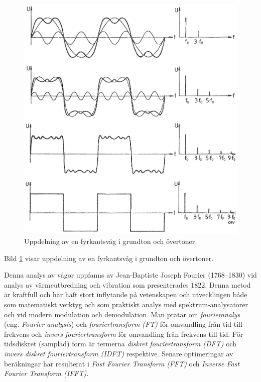 \begin{figure}
  \includegraphics[width=.9\textwidth]{images/cropped_pdfs/bild_2_1-20.pdf}
  \caption{Uppdelning av en fyrkantsvåg i grundton och övertoner}
  \label{fig:BildII1-20}
\end{figure}

Bild \ref{fig:BildII1-20} visar uppdelning av en fyrkantsvåg i grundton och
övertoner.


Denna analys av vågor uppfanns av Jean-Baptiste Joseph Fourier (1768--1830)
vid analys av värmeutbredning och vibration som presenterades 1822.
Denna metod är kraftfull och har haft stort inflytande på vetenskapen och
utvecklingen både som matematiskt verktyg och som praktiskt analys med
spektrum-analysatorer och vid modern modulation och demodulation.
Man pratar om \emph{fourieranalys} (eng. \emph{Fourier analysis}) och
\emph{fouriertransform (FT)} för omvandling från tid till frekvens och
\emph{invers fouriertransform} för omvandling från frekvens till tid.
För tidsdiskret (samplad) form är termerna
\emph{diskret fouriertransform (DFT)} och
\emph{invers diskret fouriertransform (IDFT)} respektive.
Senare optimeringar av beräkningar har resulterat i
\emph{Fast Fourier Transform (FFT)} och
\emph{Inverse Fast Fourier Transform (IFFT)}.

